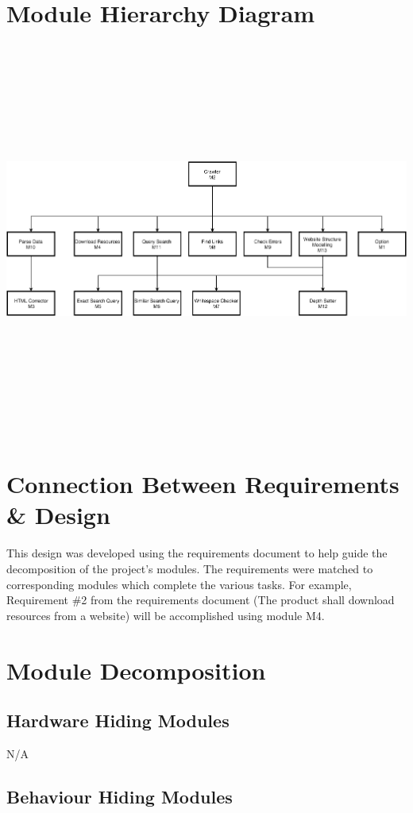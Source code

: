 \documentclass[titlepage]{article}
\begin{document}
\section{Module Hierarchy Diagram}
\includegraphics[width=19cm, height=13cm]{UsesDiagram}


\section{Connection Between Requirements \& Design}

This design was developed using the requirements document to help guide the decomposition of the project's modules. The requirements were matched to corresponding modules which complete the various tasks. For example, Requirement \#2 from the requirements document (The product shall download resources from a website) will be accomplished using module M4.


\section{Module Decomposition}
\subsection{Hardware Hiding Modules}
N/A
\subsection{Behaviour Hiding Modules}
\end{document}
